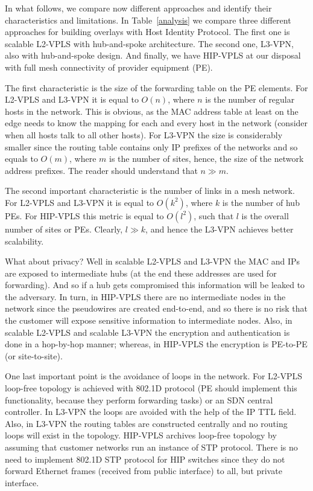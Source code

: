 In what follows, we compare now different approaches and identify their
characteristics and limitations. In Table~\ref{analysis} we 
compare three different approaches for building overlays with Host 
Identity Protocol. The first one is scalable L2-VPLS with hub-and-spoke
architecture. The second one, L3-VPN, also with hub-and-spoke 
design. And finally, we have HIP-VPLS at our disposal with full mesh connectivity 
of provider equipment (PE).

The first characteristic is the size of the forwarding table on the PE elements. For 
L2-VPLS and L3-VPN it is equal to $O(n)$, where $n$ is the number of regular hosts in the
network. This is obvious, as the MAC address table at least on the edge needs to know
the mapping for each and every host in the network (consider when all hosts talk to 
all other hosts). For L3-VPN the size is considerably smaller since the routing table
contains only IP prefixes of the networks and so equals to $O(m)$, where $m$ is the number 
of sites, hence, the size of the network address prefixes. The reader should understand
that $n \gg m$.

The second important characteristic is the number of links in a mesh network. For L2-VPLS 
and L3-VPN it is equal to $O(k^2)$, where $k$ is the number of hub PEs. For HIP-VPLS
this metric is equal to $O(l^2)$, such that $l$ is the overall number of sites or PEs.
Clearly, $l \gg k$, and hence the L3-VPN achieves better scalability.

What about privacy? Well in scalable L2-VPLS and L3-VPN the MAC and IPs are exposed to intermediate hubs 
(at the end these addresses are used for forwarding). And so if a hub gets compromised 
this information will be leaked to the adversary. In turn, in HIP-VPLS there are no intermediate nodes
in the network since the pseudowires are created end-to-end, and so there is no risk that the 
customer will expose sensitive information to intermediate nodes. Also, in scalable L2-VPLS and scalable L3-VPN 
the encryption and authentication is done in a hop-by-hop manner; whereas, in HIP-VPLS the 
encryption is PE-to-PE (or site-to-site). 

One last important point is the avoidance of loops in the network. For L2-VPLS loop-free topology
is achieved with 802.1D protocol (PE should implement this functionality, because they perform forwarding
tasks) or an SDN central controller. In L3-VPN the loops are avoided with the help of the IP TTL field. 
Also, in L3-VPN the routing tables are constructed centrally and no routing loops will exist 
in the topology. HIP-VPLS archives loop-free topology by assuming that customer networks run an 
instance of STP protocol. There is no need to implement 802.1D STP protocol for HIP switches
since they do not forward Ethernet frames (received from public interface) to all, 
but private interface.

